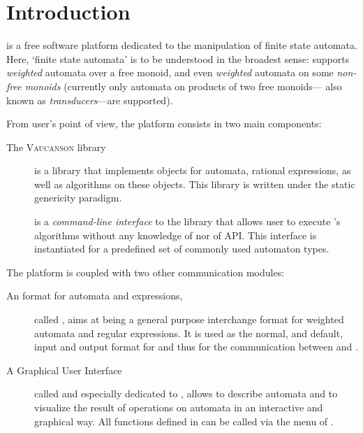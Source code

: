 \chapter*{Introduction}

\vcsn is a free software platform dedicated to the manipulation of
finite state automata.  Here, `finite state automata' is to be
understood in the broadest sense: \vcsn supports \emph{weighted}
automata over a free monoid, and even \emph{weighted} automata on some
\emph{non-free monoids} (currently only automata on products of two
free monoids--- also known as \emph{transducers}---are supported).


\bigskip

From user's point of view, the platform consists in two main components:

\begin{description}
\item[The {\textnormal{\textsc{Vaucanson}}} library] is a \Cpp library that implements objects for
  automata, rational expressions, as well as algorithms on these
  objects.  
  This library is written under the static genericity paradigm.

\item[\tafkit] is a \emph{command-line interface} to the library that allows
  user to execute \vcsn's algorithms without any knowledge of \Cpp 
  nor of \vcsn API.
  This  interface is instantiated for a
  predefined set of commonly used automaton types.
  
\end{description}

The platform is coupled with two other communication modules:

\begin{description}
\item[An \xml format for automata and expressions\textnormal{,}] called \fsmxml,
aims at being a general purpose interchange format for weighted
automata and regular expressions. 
It is used as the normal, and default, input and 
output format for \tafkit and thus for the communication between 
\tafkit and \vgi.

\item[A Graphical User Interface] called \vgi and especially dedicated to
\vcsn,
allows to describe automata and to visualize
the result of operations on automata in an interactive and graphical 
way.   
All functions
defined in \tafkit can be called via the menu of \vgi.

\end{description}

